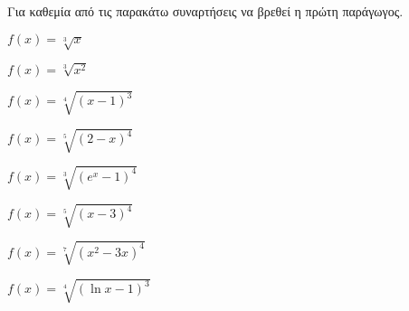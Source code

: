 Για καθεμία από τις παρακάτω συναρτήσεις να βρεθεί η πρώτη παράγωγος.
\begin{multicols}{2}
\begin{alist}
\item $ f(x)=\sqrt[3]{x} $
\item $ f(x)=\sqrt[3]{x^2} $
\item $ f(x)=\sqrt[4]{(x-1)^3} $
\item $ f(x)=\sqrt[5]{(2-x)^4} $
\item $ f(x)=\sqrt[3]{(e^x-1)^4} $
\item $ f(x)=\sqrt[5]{(x-3)^4} $
\item $ f(x)=\sqrt[7]{(x^2-3x)^4} $
\item $ f(x)=\sqrt[4]{(\ln{x}-1)^3} $
\end{alist}
\end{multicols}
